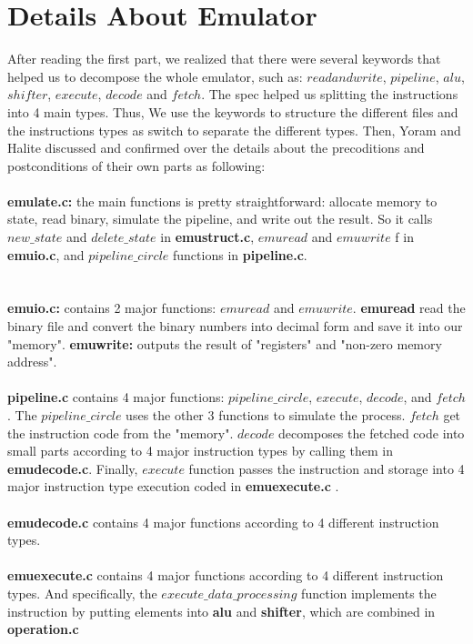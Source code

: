 \documentclass[a4paper]{article}
\begin{document}
\section{Details About Emulator}
After reading the first part, we realized that there were several keywords that helped us to decompose the whole emulator, such as: $read and write$, $pipeline$, $alu$, $shifter$, $execute$, $decode$ and $fetch$. The spec helped us splitting the instructions into 4 main types. Thus, We use the keywords to structure the different files and the instructions types as switch to separate the different types. Then, Yoram and Halite discussed and confirmed over the details about the precoditions and postconditions of their own parts as following:
\\\\
\textbf{emulate.c:} the main functions is pretty straightforward: allocate memory to state, read binary, simulate the pipeline, and write out the result. So it calls $new\_state$ and $delete\_state$ in \textbf{emustruct.c}, $emuread$ and $emuwrite$ f in \textbf{emuio.c}, and $pipeline\_circle$ functions in \textbf{pipeline.c}.\\
\\\\
\textbf{emuio.c:} contains 2 major functions: $emuread$ and $emuwrite$. \textbf{emuread} read the binary file and convert the binary numbers into decimal form and save it into our "memory".
\textbf{emuwrite:} outputs the result of "registers" and "non-zero memory address".
\\\\
\textbf{pipeline.c} contains 4 major functions: $pipeline\_circle$, $execute$, $decode$, and $fetch$. The $pipeline\_circle$ uses the other 3 functions to simulate the process. $fetch$ get the instruction code from the "memory". $decode$ decomposes the fetched code into small parts according to 4 major instruction types by calling them in \textbf{emudecode.c}. Finally, $execute$ function passes the instruction and storage into 4 major instruction type execution coded in \textbf{emuexecute.c} .
\\\\
\textbf{emudecode.c} contains 4 major functions according to 4 different instruction types.
\\\\
\textbf{emuexecute.c} contains 4 major functions according to 4 different instruction types. And specifically, the $execute\_data\_processing$ function implements the instruction by putting elements into \textbf{alu} and \textbf{shifter}, which are combined in \textbf{operation.c}\\
\end{document}
